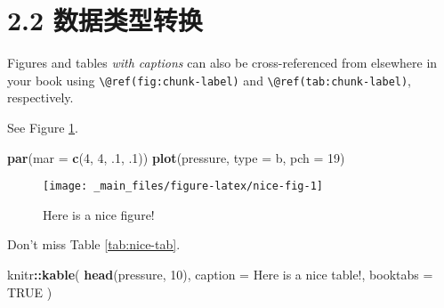 \documentclass[
]{book}
\newenvironment{Shaded}{\begin{snugshade}}{\end{snugshade}}
\newcommand{\AttributeTok}[1]{\textcolor[rgb]{0.13,0.29,0.53}{#1}}
\newcommand{\ConstantTok}[1]{\textcolor[rgb]{0.56,0.35,0.01}{#1}}
\newcommand{\DecValTok}[1]{\textcolor[rgb]{0.00,0.00,0.81}{#1}}
\newcommand{\FunctionTok}[1]{\textcolor[rgb]{0.13,0.29,0.53}{\textbf{#1}}}
\newcommand{\NormalTok}[1]{#1}
\newcommand{\SpecialCharTok}[1]{\textcolor[rgb]{0.81,0.36,0.00}{\textbf{#1}}}
\newcommand{\StringTok}[1]{\textcolor[rgb]{0.31,0.60,0.02}{#1}}
\theoremstyle{definition}
\theoremstyle{definition}
\theoremstyle{definition}
\theoremstyle{definition}
\theoremstyle{remark}
\begin{document}
\hypertarget{ux6570ux636eux7c7bux578bux8f6cux6362}{%
\section*{2.2 数据类型转换}\label{ux6570ux636eux7c7bux578bux8f6cux6362}}

Figures and tables \emph{with captions} can also be cross-referenced from elsewhere in your book using \texttt{\textbackslash{}@ref(fig:chunk-label)} and \texttt{\textbackslash{}@ref(tab:chunk-label)}, respectively.

See Figure \ref{fig:nice-fig}.

\begin{Shaded}
\begin{Highlighting}[]
\FunctionTok{par}\NormalTok{(}\AttributeTok{mar =} \FunctionTok{c}\NormalTok{(}\DecValTok{4}\NormalTok{, }\DecValTok{4}\NormalTok{, .}\DecValTok{1}\NormalTok{, .}\DecValTok{1}\NormalTok{))}
\FunctionTok{plot}\NormalTok{(pressure, }\AttributeTok{type =} \StringTok{\textquotesingle{}b\textquotesingle{}}\NormalTok{, }\AttributeTok{pch =} \DecValTok{19}\NormalTok{)}
\end{Highlighting}
\end{Shaded}

\begin{figure}

{\centering \texttt{[image: \_main\_files/figure-latex/nice-fig-1]} 

}

\caption{Here is a nice figure!}\label{fig:nice-fig}
\end{figure}

Don't miss Table \ref{tab:nice-tab}.

\begin{Shaded}
\begin{Highlighting}[]
\NormalTok{knitr}\SpecialCharTok{::}\FunctionTok{kable}\NormalTok{(}
  \FunctionTok{head}\NormalTok{(pressure, }\DecValTok{10}\NormalTok{), }\AttributeTok{caption =} \StringTok{\textquotesingle{}Here is a nice table!\textquotesingle{}}\NormalTok{,}
  \AttributeTok{booktabs =} \ConstantTok{TRUE}
\NormalTok{)}
\end{Highlighting}
\end{Shaded}
\end{document}
